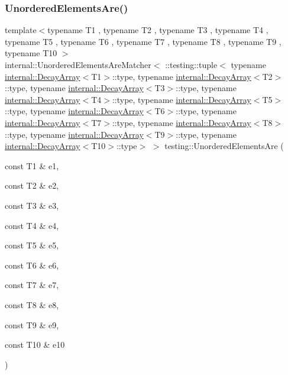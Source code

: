 \subsubsection{\texorpdfstring{UnorderedElementsAre()}{UnorderedElementsAre()}\hspace{0.1cm}{\footnotesize\ttfamily [11/11]}}
{\footnotesize\ttfamily template$<$typename T1 , typename T2 , typename T3 , typename T4 , typename T5 , typename T6 , typename T7 , typename T8 , typename T9 , typename T10 $>$ \\
internal\+::\+Unordered\+Elements\+Are\+Matcher$<$ \+::testing\+::tuple$<$ typename \mbox{\hyperlink{structtesting_1_1internal_1_1DecayArray}{internal\+::\+Decay\+Array}}$<$T1$>$\+::type, typename \mbox{\hyperlink{structtesting_1_1internal_1_1DecayArray}{internal\+::\+Decay\+Array}}$<$T2$>$\+::type, typename \mbox{\hyperlink{structtesting_1_1internal_1_1DecayArray}{internal\+::\+Decay\+Array}}$<$T3$>$\+::type, typename \mbox{\hyperlink{structtesting_1_1internal_1_1DecayArray}{internal\+::\+Decay\+Array}}$<$T4$>$\+::type, typename \mbox{\hyperlink{structtesting_1_1internal_1_1DecayArray}{internal\+::\+Decay\+Array}}$<$T5$>$\+::type, typename \mbox{\hyperlink{structtesting_1_1internal_1_1DecayArray}{internal\+::\+Decay\+Array}}$<$T6$>$\+::type, typename \mbox{\hyperlink{structtesting_1_1internal_1_1DecayArray}{internal\+::\+Decay\+Array}}$<$T7$>$\+::type, typename \mbox{\hyperlink{structtesting_1_1internal_1_1DecayArray}{internal\+::\+Decay\+Array}}$<$T8$>$\+::type, typename \mbox{\hyperlink{structtesting_1_1internal_1_1DecayArray}{internal\+::\+Decay\+Array}}$<$T9$>$\+::type, typename \mbox{\hyperlink{structtesting_1_1internal_1_1DecayArray}{internal\+::\+Decay\+Array}}$<$T10$>$\+::type$>$ $>$ testing\+::\+Unordered\+Elements\+Are (\begin{DoxyParamCaption}\item[{const T1 \&}]{e1,  }\item[{const T2 \&}]{e2,  }\item[{const T3 \&}]{e3,  }\item[{const T4 \&}]{e4,  }\item[{const T5 \&}]{e5,  }\item[{const T6 \&}]{e6,  }\item[{const T7 \&}]{e7,  }\item[{const T8 \&}]{e8,  }\item[{const T9 \&}]{e9,  }\item[{const T10 \&}]{e10 }\end{DoxyParamCaption})\hspace{0.3cm}{\ttfamily [inline]}}

